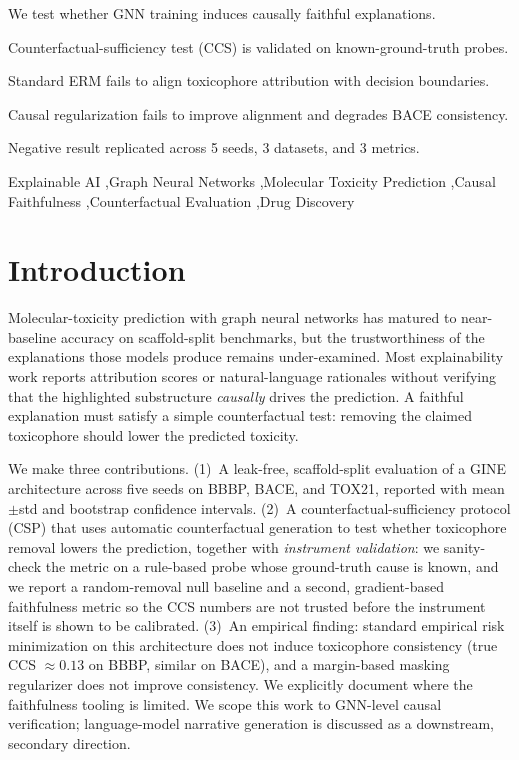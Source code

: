 \documentclass[a4paper,fleqn]{cas-dc}
\begin{document}
\begin{highlights}
\item We test whether GNN training induces causally faithful explanations.
\item Counterfactual-sufficiency test (CCS) is validated on known-ground-truth probes.
\item Standard ERM fails to align toxicophore attribution with decision boundaries.
\item Causal regularization fails to improve alignment and degrades BACE consistency.
\item Negative result replicated across 5 seeds, 3 datasets, and 3 metrics.
\end{highlights}

\begin{keywords}
Explainable AI \sep Graph Neural Networks \sep Molecular Toxicity Prediction \sep Causal Faithfulness \sep Counterfactual Evaluation \sep Drug Discovery
\end{keywords}

\maketitle

\section{Introduction}
Molecular-toxicity prediction with graph neural networks has matured to near-baseline accuracy on scaffold-split benchmarks, but the trustworthiness of the explanations those models produce remains under-examined. Most explainability work reports attribution scores or natural-language rationales without verifying that the highlighted substructure \emph{causally} drives the prediction. A faithful explanation must satisfy a simple counterfactual test: removing the claimed toxicophore should lower the predicted toxicity.

We make three contributions. (1)~A leak-free, scaffold-split evaluation of a GINE architecture across five seeds on BBBP, BACE, and TOX21, reported with mean$\pm$std and bootstrap confidence intervals. (2)~A counterfactual-sufficiency protocol (CSP) that uses automatic counterfactual generation to test whether toxicophore removal lowers the prediction, together with \emph{instrument validation}: we sanity-check the metric on a rule-based probe whose ground-truth cause is known, and we report a random-removal null baseline and a second, gradient-based faithfulness metric so the CCS numbers are not trusted before the instrument itself is shown to be calibrated. (3)~An empirical finding: standard empirical risk minimization on this architecture does not induce toxicophore consistency (true CCS $\approx 0.13$ on BBBP, similar on BACE), and a margin-based masking regularizer does not improve consistency. We explicitly document where the faithfulness tooling is limited. We scope this work to GNN-level causal verification; language-model narrative generation is discussed as a downstream, secondary direction.
\end{document}
